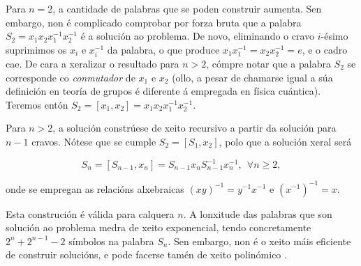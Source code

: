 \begin{refsection}
\begin{multicols}{2}
Para $n=2$, a cantidade de palabras que se poden construir aumenta. Sen
embargo, non é complicado comprobar por forza bruta que a palabra $S_2 = x_1
x_2 x_1^{-1} x_2^{-1}$ é a solución ao problema. De novo, eliminando o cravo
$i$-ésimo suprimimos os $x_i$ e $x_i^{-1}$ da palabra, o que produce $x_1
x_1^{-1} = x_2 x_2^{-1} = e$, e o cadro cae. De cara a xeralizar o resultado
para $n>2$, cómpre notar que a palabra $S_2$ se corresponde co
\textit{conmutador} de $x_1$ e $x_2$ (ollo, a pesar de chamarse igual a súa
definición en teoría de grupos é diferente á empregada en física cuántica).
Teremos entón $S_2 = [x_1,x_2] = x_1 x_2 x_1^{-1} x_2^{-1}$.

Para $n>2$, a solución constrúese de xeito recursivo a partir da solución para
$n-1$ cravos. Nótese que se cumple $S_2 = [S_1,x_2]$, polo que a solución xeral
será

\begin{equation}
    S_n = [S_{n-1},x_n] = S_{n-1} x_n S_{n-1}^{-1} x_n^{-1},
    ~~ \forall n \geq 2,
\end{equation}

\noindent onde se empregan as relacións
alxebraicas $(x y)^{-1} = y^{-1} x^{-1}$ e $(x^{-1})^{-1} = x$.

Esta construción é válida para calquera $n$. A lonxitude das palabras que son
solución ao problema medra de xeito exponencial, tendo concretamente $2^n +
2^{n-1} - 2$ símbolos na palabra $S_n$. Sen embargo, non é o xeito máis
eficiente de construir solucións, e pode facerse tamén de xeito polinómico \cite{Demaine_2013}.
\printbibliography

\end{multicols}
\end{refsection}